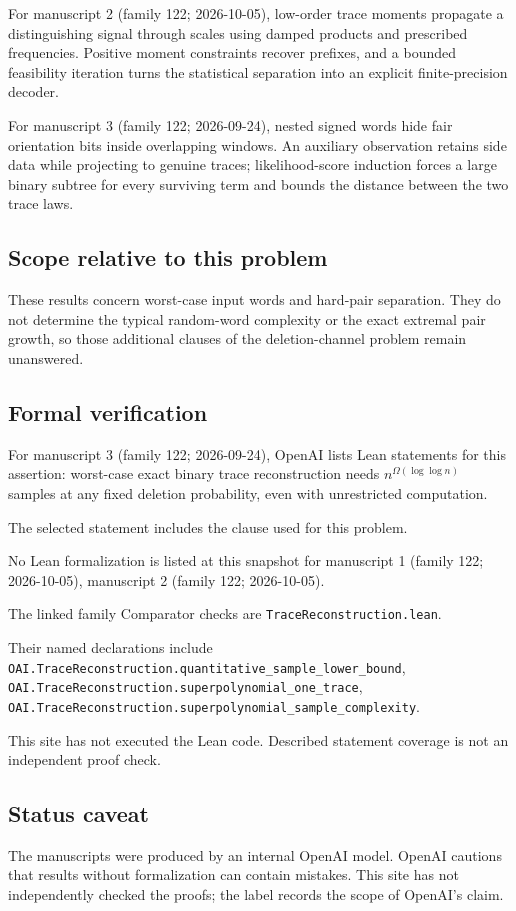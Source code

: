 \documentclass[11pt]{article}
\begin{document}
For manuscript 2 (family 122; 2026-10-05), low-order trace moments propagate a distinguishing signal through scales using damped products and prescribed frequencies. Positive moment constraints recover prefixes, and a bounded feasibility iteration turns the statistical separation into an explicit finite-precision decoder.

For manuscript 3 (family 122; 2026-09-24), nested signed words hide fair orientation bits inside overlapping windows. An auxiliary observation retains side data while projecting to genuine traces; likelihood-score induction forces a large binary subtree for every surviving term and bounds the distance between the two trace laws.

\subsection{Scope relative to this problem}
These results concern worst-case input words and hard-pair separation. They do not determine the typical random-word complexity or the exact extremal pair growth, so those additional clauses of the deletion-channel problem remain unanswered.

\subsection{Formal verification}
For manuscript 3 (family 122; 2026-09-24), OpenAI lists Lean statements for this assertion: worst-case exact binary trace reconstruction needs $n^{\Omega(\log\log n)}$ samples at any fixed deletion probability, even with unrestricted computation.

The selected statement includes the clause used for this problem.

No Lean formalization is listed at this snapshot for manuscript 1 (family 122; 2026-10-05), manuscript 2 (family 122; 2026-10-05).

The linked family Comparator checks are \texttt{TraceReconstruction.lean}.

Their named declarations include \texttt{OAI.TraceReconstruction.quantitative\_sample\_lower\_bound}, \texttt{OAI.TraceReconstruction.superpolynomial\_one\_trace}, \texttt{OAI.TraceReconstruction.superpolynomial\_sample\_complexity}.

This site has not executed the Lean code. Described statement coverage is not an independent proof check.

\subsection{Status caveat}
The manuscripts were produced by an internal OpenAI model. OpenAI cautions that results without formalization can contain mistakes. This site has not independently checked the proofs; the label records the scope of OpenAI's claim.
\end{document}
